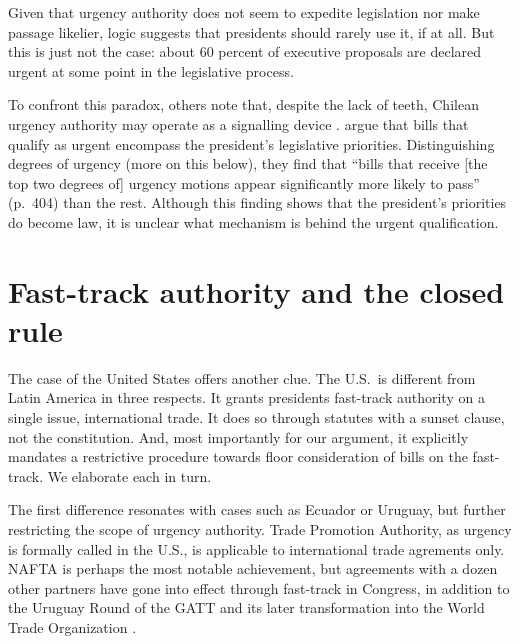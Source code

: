 \documentclass[letter,12pt]{article}
\begin{document}
Given that urgency authority does not seem to expedite legislation nor make passage likelier, logic suggests that presidents should rarely use it, if at all. But this is just not the case: about 60 percent of executive proposals are declared urgent at some point in the legislative process. 

To confront this paradox, others note that, despite the lack of teeth, Chilean urgency authority may operate as a signalling device \citep{berrios.gamboa.fiscChile.2006,aninat.exagCoop2006}. \citet{aleman.navia.UrgChi.2009} argue that bills that qualify as urgent encompass the president's legislative priorities. Distinguishing degrees of urgency (more on this below), they find that ``bills that receive [the top two degrees of] urgency motions appear significantly more likely to pass'' (p.~404) than the rest. Although this finding shows that the president's priorities do become law, it is unclear what mechanism is behind the urgent qualification.


\section{Fast-track authority and the closed rule}


The case of the United States offers another clue. The U.S.\ is different from Latin America in three respects. It grants presidents fast-track authority on a single issue, international trade. It does so through statutes with a sunset clause, not the constitution. And, most importantly for our argument, it explicitly mandates a restrictive procedure towards floor consideration of bills on the fast-track. We elaborate each in turn.

The first difference resonates with cases such as Ecuador or Uruguay, but further restricting the scope of urgency authority. Trade Promotion Authority, as urgency is formally called in the U.S., is applicable to international trade agrements only. NAFTA is perhaps the most notable achievement, but agreements with a dozen other partners have gone into effect through fast-track in Congress, in addition to the Uruguay Round of the GATT and its later transformation into the World Trade Organization \citep{crs-2015-tpa}. 
\end{document}
